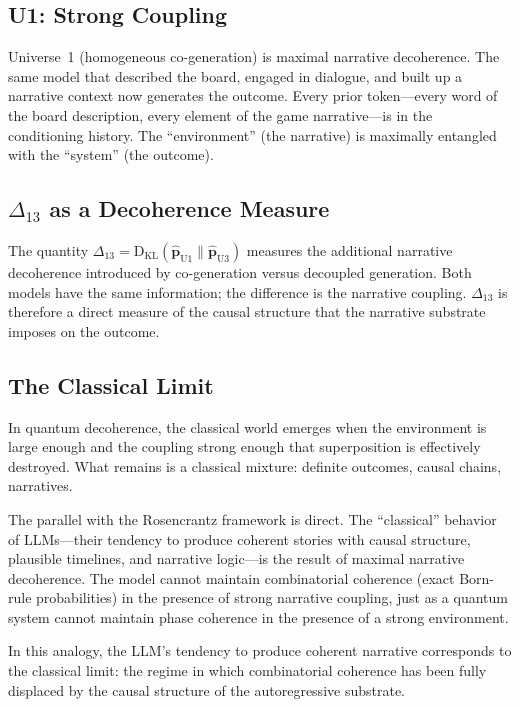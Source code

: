\documentclass[12pt,a4paper]{article}
\theoremstyle{definition}
\theoremstyle{remark}
\newcommand{\KL}{\mathrm{D}_{\mathrm{KL}}}
\begin{document}
\subsection{U1: Strong Coupling}

Universe~1 (homogeneous co-generation) is maximal narrative
decoherence.  The same model that described the board, engaged in
dialogue, and built up a narrative context now generates the outcome.
Every prior token---every word of the board description, every element
of the game narrative---is in the conditioning history.  The
``environment'' (the narrative) is maximally entangled with the
``system'' (the outcome).

\subsection{$\Delta_{13}$ as a Decoherence Measure}

The quantity $\Delta_{13} = \KL(\hat{\mathbf{p}}_{\mathrm{U1}} \|
\hat{\mathbf{p}}_{\mathrm{U3}})$ measures the additional narrative
decoherence introduced by co-generation versus decoupled generation.
Both models have the same information; the difference is the narrative
coupling.  $\Delta_{13}$ is therefore a direct measure of the causal
structure that the narrative substrate imposes on the outcome.

\subsection{The Classical Limit}

In quantum decoherence, the classical world emerges when the
environment is large enough and the coupling strong enough that
superposition is effectively destroyed.  What remains is a classical
mixture: definite outcomes, causal chains, narratives.

The parallel with the Rosencrantz framework is direct.  The
``classical'' behavior of LLMs---their tendency to produce coherent
stories with causal structure, plausible timelines, and narrative
logic---is the result of maximal narrative decoherence.  The model
cannot maintain combinatorial coherence (exact Born-rule
probabilities) in the presence of strong narrative coupling, just as
a quantum system cannot maintain phase coherence in the presence of
a strong environment.

In this analogy, the LLM's tendency to produce coherent narrative
corresponds to the classical limit: the regime in which combinatorial
coherence has been fully displaced by the causal structure of the
autoregressive substrate.
\end{document}

